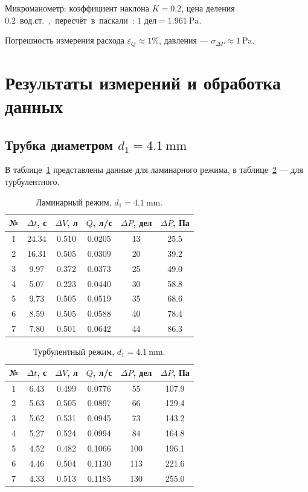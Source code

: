 \documentclass[12pt,a4paper]{article}
\begin{document}
Микроманометр: коэффициент наклона $K = 0.2$, цена деления \qty{0.2}{\mm вод.ст.}, пересчёт в паскали: $1\text{ дел} = \qty{1.961}{\Pa}$.

Погрешность измерения расхода $\varepsilon_Q \approx 1\%$, давления — $\sigma_{\Delta P} \approx \qty{1}{\Pa}$.

\section{Результаты измерений и обработка данных}

\subsection{Трубка диаметром $d_1 = \qty{4.1}{\mm}$}

В таблице~\ref{tab:d1_lam} представлены данные для ламинарного режима, в таблице~\ref{tab:d1_turb} — для турбулентного.

\begin{table}[H]
\centering
\caption{Ламинарный режим, $d_1 = \qty{4.1}{\mm}$.}
\label{tab:d1_lam}
\begin{tabular}{c c c c c c}
\toprule
№ & $\Delta t$, с & $\Delta V$, л & $Q$, л/с & $\Delta P$, дел & $\Delta P$, Па \\
\midrule
1 & 24.34 & 0.510 & 0.0205 & 13 & 25.5 \\
2 & 16.31 & 0.505 & 0.0309 & 20 & 39.2 \\
3 & 9.97  & 0.372 & 0.0373 & 25 & 49.0 \\
4 & 5.07  & 0.223 & 0.0440 & 30 & 58.8 \\
5 & 9.73  & 0.505 & 0.0519 & 35 & 68.6 \\
6 & 8.59  & 0.505 & 0.0588 & 40 & 78.4 \\
7 & 7.80  & 0.501 & 0.0642 & 44 & 86.3 \\
\bottomrule
\end{tabular}
\end{table}

\begin{table}[H]
\centering
\caption{Турбулентный режим, $d_1 = \qty{4.1}{\mm}$.}
\label{tab:d1_turb}
\begin{tabular}{c c c c c c}
\toprule
№ & $\Delta t$, с & $\Delta V$, л & $Q$, л/с & $\Delta P$, дел & $\Delta P$, Па \\
\midrule
1 & 6.43 & 0.499 & 0.0776 & 55 & 107.9 \\
2 & 5.63 & 0.505 & 0.0897 & 66 & 129.4 \\
3 & 5.62 & 0.531 & 0.0945 & 73 & 143.2 \\
4 & 5.27 & 0.524 & 0.0994 & 84 & 164.8 \\
5 & 4.52 & 0.482 & 0.1066 & 100 & 196.1 \\
6 & 4.46 & 0.504 & 0.1130 & 113 & 221.6 \\
7 & 4.33 & 0.513 & 0.1185 & 130 & 255.0 \\
\bottomrule
\end{tabular}
\end{table}
\end{document}
